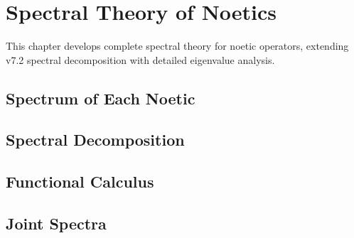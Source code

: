 \chapter{Spectral Theory of Noetics}
\label{ch:spectral-theory}

\begin{tcolorbox}[colback=blue!5!white,colframe=blue!75!black,title=\vnewthree]
This chapter develops complete spectral theory for noetic operators, extending v7.2 spectral decomposition with detailed eigenvalue analysis.
\end{tcolorbox}

\section{Spectrum of Each Noetic}
\label{sec:spectrum-each-noetic}

\section{Spectral Decomposition}
\label{sec:spectral-decomposition}

\section{Functional Calculus}
\label{sec:functional-calculus}

\section{Joint Spectra}
\label{sec:joint-spectra}

